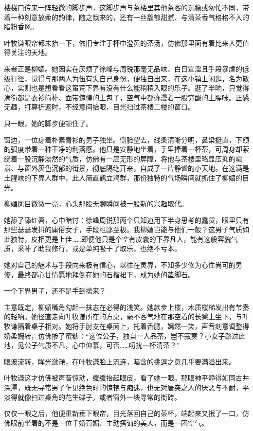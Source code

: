 楼梯口传来一阵轻微的脚步声，这脚步声与茶楼里其他茶客的沉稳或匆忙不同，带着一种刻意放柔的韵律，随之飘来的，还有一丝馥郁甜腻、与清茶香气格格不入的脂粉香风。

叶牧谦眼帘都未抬一下，依旧专注于杯中澄黄的茶汤，仿佛那里面有着比来人更值得关注的天地。

来者正是柳媚。她因实在厌烦了徐峰与周锐那毫无品味、白日宣淫且手段暴虐的低级行径，觉得与那两人为伍有失自己身份，便独自出来，在这小镇上闲逛，名为散心，实则也是想看看这蛮荒下界有没有什么能稍稍入眼的乐子。逛了半晌，只觉得满街都是衣衫简朴、面带惊惶的土包子，空气中都弥漫着一股穷酸的土腥味。正感无趣，打算折返时，不经意间抬眼，目光扫过茶楼二楼的窗口。

只一眼，她的脚步便顿住了。

窗边，一位身着朴素青衫的男子独坐。侧脸望去，线条清晰分明，鼻梁挺直，下颌的弧度带着一种干净的利落感。他只是安静地坐着，手里捧着一杯茶，可周身却萦绕着一股沉静淡然的气质，仿佛有一层无形的屏障，将他与茶楼里略显压抑的喧嚣、与窗外灰色沉郁的街景，彻底隔绝开来，自成了一片静谧的小天地。在这满是土腥味的下界人群中，此人简直鹤立鸡群，那份独特的气场瞬间就抓住了柳媚的目光。

柳媚凤目微微一亮，心头那股无聊瞬间被一股新的兴趣取代。

她舔了舔红唇，心中暗忖：徐峰周锐那两个只知道用下半身思考的蠢货，眼里只有那些瑟瑟发抖的庸俗女子，手段粗鄙至极。我柳媚岂能与他们一般？这男子气质如此独特，皮相更是上佳……即便他只是个空有皮囊的下界凡人，能有这般容貌气质，采补了助我修行，或是单纯吸干了取乐，也绝不亏本。

她对自己的魅术与手段向来极有信心，以往在灵界，不知多少修为心性尚可的男修，最终都心甘情愿地拜倒在她的石榴裙下，成为她的垫脚石。

一个下界男子，还不是手到擒来？

主意既定，柳媚嘴角勾起一抹志在必得的浅笑。她款步上楼，木质楼梯发出有节奏的轻响。她径直走向叶牧谦所在的方桌，毫不客气地在那空着的长凳上坐下，与叶牧谦隔着桌子相对。她将手肘支在桌面上，托着香腮，嫣然一笑，声音刻意调整得娇柔婉转，仿佛掺了蜜糖：“这位公子，独自一人品茶，岂不寂寞？小女子路过此地，见公子气质不凡，心中仰慕，可否……叨扰一杯清茶？”

眼波流转，眸光潋滟，在叶牧谦脸上流连，暗含的挑逗之意几乎要满溢出来。

叶牧谦这才仿佛被声音惊动，缓缓抬起眼皮，看了她一眼。那眼神平静得如同古井深潭，既无寻常男子乍见绝色时的惊艳与痴迷，也无对唐突之人的厌恶与不耐，平淡得就像扫过桌角的花生碟子，或者窗外一块寻常的街砖。

仅仅一眼之后，他便重新垂下眼帘，目光落回自己的茶杯，端起来又抿了一口，仿佛眼前坐着的不是一位千娇百媚、主动搭讪的美人，而是一团空气。

